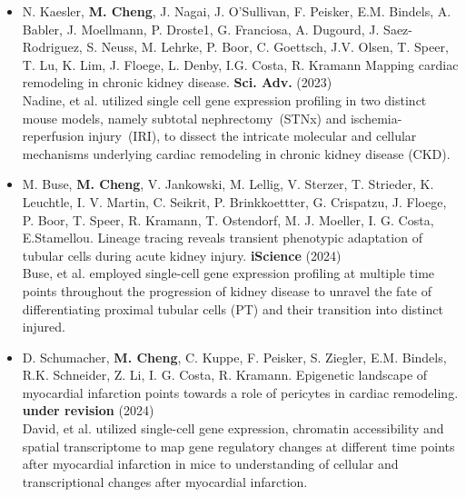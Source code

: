 \begin{addmargin}{0.02\textwidth}
	\begin{itemize}
	\item N. Kaesler, \textbf{M. Cheng}, J. Nagai, J. O’Sullivan, F. Peisker, E.M. Bindels, A. Babler, J. Moellmann, P. Droste1, G. Franciosa, A. Dugourd, J. Saez-Rodriguez, S. Neuss, M. Lehrke, P. Boor, C. Goettsch, J.V. Olsen, T. Speer, T. Lu, K. Lim,
J. Floege, L. Denby, I.G. Costa, R. Kramann Mapping cardiac remodeling in chronic kidney disease. \textbf{Sci. Adv.} (2023)\\

	Nadine, et al. utilized single cell gene expression profiling in two distinct mouse models, namely subtotal nephrectomy~(STNx) and ischemia-reperfusion injury~(IRI), to dissect the intricate molecular and cellular mechanisms underlying cardiac remodeling in chronic kidney disease (CKD). \\
	\end{itemize}
\end{addmargin}

\begin{addmargin}{0.02\textwidth}
	\begin{itemize}
	\item M. Buse, \textbf{M. Cheng}, V. Jankowski, M. Lellig, V. Sterzer, T. Strieder, K. Leuchtle, I. V. Martin, C. Seikrit, P. Brinkkoettter, G. Crispatzu, J. Floege, P. Boor, T. Speer, R. Kramann, T. Ostendorf, M. J. Moeller, I. G. Costa, E.Stamellou. Lineage tracing reveals transient phenotypic adaptation of tubular cells during acute kidney injury. \textbf{iScience} (2024)  \\

	Buse, et al. employed single-cell gene expression profiling at multiple time points throughout the progression of kidney disease to unravel the fate of differentiating proximal tubular cells (PT) and their transition into distinct injured. \\
	\end{itemize}
\end{addmargin}

\begin{addmargin}{0.02\textwidth}
	\begin{itemize}
	\item D. Schumacher, \textbf{M. Cheng}, C. Kuppe, F. Peisker, S. Ziegler, E.M. Bindels, R.K. Schneider,  Z. Li,  I. G. Costa, R. Kramann. Epigenetic landscape of myocardial infarction points towards a role of pericytes in cardiac remodeling. \textbf{under revision} (2024) \\

	David, et al. utilized single-cell gene expression, chromatin accessibility and spatial transcriptome to map gene regulatory changes  at different time points after myocardial infarction in mice to understanding of cellular and transcriptional changes after myocardial infarction.\\
	\end{itemize}
\end{addmargin}



